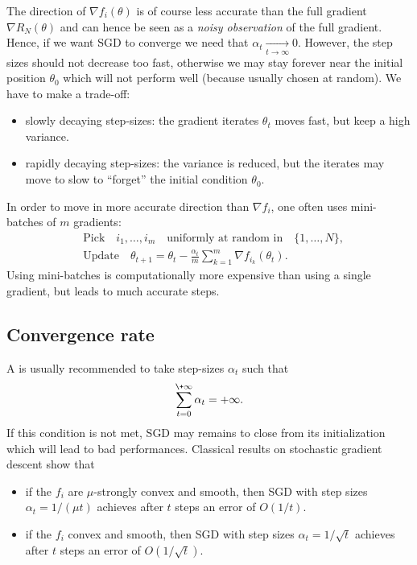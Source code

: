 \documentclass[11pt,nocut]{article}
\begin{document}
The direction of $\nabla f_i(\theta)$ is of course less accurate than the full gradient $\nabla R_N(\theta)$ and can hence be seen as a \emph{noisy observation} of the full gradient.
Hence, if we want SGD to converge we need that $\alpha_t \xrightarrow[t \to \infty]{} 0$. However, the step sizes should not decrease too fast, otherwise we may stay forever near the initial position $\theta_0$ which will not perform well (because usually chosen at random).
We have to make a trade-off:
\begin{itemize}
	\item slowly decaying step-sizes: the gradient iterates $\theta_t$ moves fast, but keep a high variance.
	\item rapidly decaying step-sizes: the variance is reduced, but the iterates may move to slow to ``forget'' the initial condition $\theta_0$.
\end{itemize}


In order to move in more accurate direction than $\nabla f_i$, one often uses mini-batches of $m$ gradients:
\begin{align*}
	&\text{Pick} \quad i_1, \dots, i_m \quad \text{uniformly at random in} \quad \{1, \dots, N\}, \\
	&\text{Update} \quad \theta_{t+1} = \theta_t - \frac{\alpha_t}{m} \sum_{k=1}^m \nabla f_{i_k}(\theta_t).
\end{align*}
Using mini-batches is computationally more expensive than using a single gradient, but leads to much accurate steps.

\subsection{Convergence rate}

A is usually recommended to take step-sizes $\alpha_t$ such that
$$
\sum_{t =0}^{\+\infty} \alpha_t = + \infty.
$$
If this condition is not met, SGD may remains to close from its initialization which will lead to bad performances.
Classical results on stochastic gradient descent show that
\begin{itemize}
	\item if the $f_i$ are $\mu$-strongly convex and smooth, then SGD with step sizes $\alpha_t = 1/(\mu t)$ achieves after $t$ steps an error of $O(1/t)$.
	\item if the $f_i$ convex and smooth, then SGD with step sizes $\alpha_t = 1/\sqrt{t}$ achieves after $t$ steps an error of $O(1/\sqrt{t})$.
\end{itemize}
\end{document}
